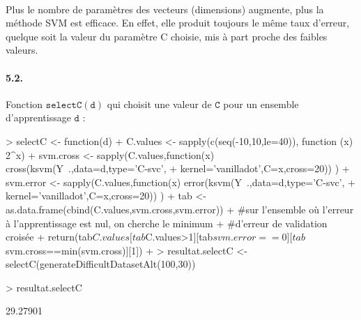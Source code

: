 \documentclass{article}
\begin{document}
\paragraph{}Plus le nombre de paramètres des vecteurs (dimensions) augmente, plus la 
méthode SVM est efficace. En effet, elle produit toujours le même taux d'erreur, 
quelque soit la valeur du paramètre C choisie, mis à part proche des faibles valeurs.
\paragraph{5.2.}Fonction $\mathtt{selectC(d)}$ qui choisit une valeur de
 $\mathtt{C}$ pour un ensemble d'apprentissage $\mathtt{d}$ :
\begin{Schunk}
\begin{Sinput}
> selectC <- function(d) {
+ 	C.values <- sapply(c(seq(-10,10,le=40)), function (x) 2^x)
+ 	svm.cross <- sapply(C.values,function(x) cross(ksvm(Y~.,data=d,type='C-svc',
+ 			kernel='vanilladot',C=x,cross=20)) )
+ 	svm.error <- sapply(C.values,function(x) error(ksvm(Y~.,data=d,type='C-svc',
+ 			kernel='vanilladot',C=x,cross=20)) ) 
+ 	tab <- as.data.frame(cbind(C.values,svm.cross,svm.error))
+ 	#sur l'ensemble où l'erreur à l'apprentissage est nul, on cherche le minimum 
+ 	#d'erreur de validation croisée
+ 	return(tab$C.values[tab$C.values>1][tab$svm.error==0][tab$svm.cross==min(svm.cross)][1])
+ }
> resultat.selectC <- selectC(generateDifficultDatasetAlt(100,30))
\end{Sinput}
\end{Schunk}
\begin{Schunk}
\begin{Sinput}
> resultat.selectC
\end{Sinput}
\begin{Soutput}
[1] 29.27901
\end{Soutput}
\end{Schunk}
\end{document}
